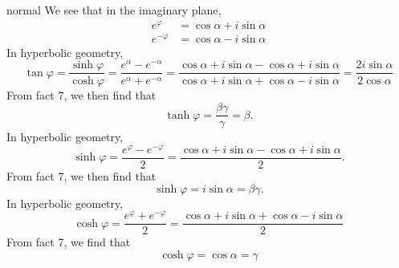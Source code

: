 \begin{solution}{normal}
We see that in the imaginary plane, 
\begin{align*}
e^\varphi &= \cos\alpha + i\sin\alpha\\
e^{-\varphi} &= \cos\alpha - i\sin\alpha
\end{align*}
In hyperbolic geometry, 
\[\tan\varphi = \frac{\sinh\varphi}{\cosh\varphi}= \frac{e^\alpha - e^{-\alpha}}{e^\alpha + e^{-\alpha}}= \frac{\cos\alpha + i\sin\alpha - \cos\alpha + i\sin\alpha}{\cos\alpha + i\sin\alpha + \cos\alpha - i\sin\alpha}= \frac{2i\sin\alpha}{2\cos\alpha}\]
From fact 7, we then find that 
\[\tanh\varphi = \frac{\beta\gamma}{\gamma} = \beta.\]
In hyperbolic geometry, 
\[\sinh\varphi = \frac{e^\varphi - e^{-\varphi}}{2} = \frac{\cos\alpha + i\sin\alpha - \cos\alpha + i\sin\alpha}{2}.\]
From fact 7, we then find that 
\[\sinh\varphi = i\sin\alpha = \beta\gamma.\]
In hyperbolic geometry, 
\[\cosh\varphi = \frac{e^\varphi + e^{-\varphi}}{2} = \frac{\cos\alpha + i\sin\alpha + \cos\alpha - i\sin\alpha}{2}\]
From fact 7, we find that 
\[\cosh\varphi = \cos\alpha = \gamma\]
\end{solution}